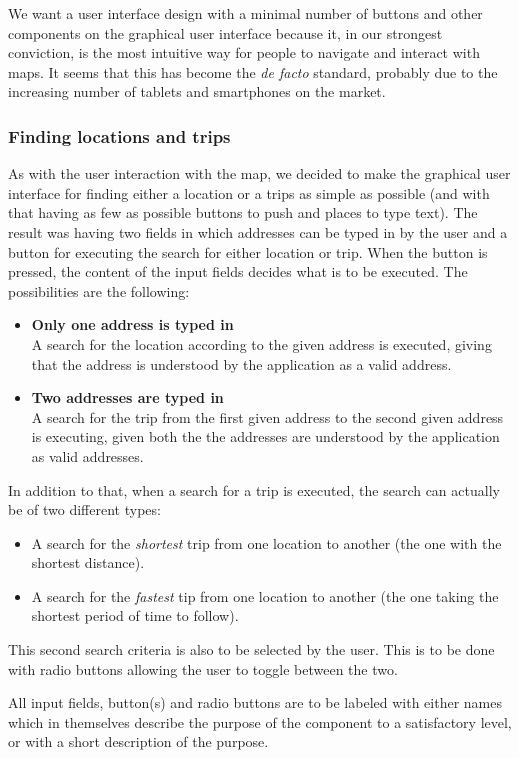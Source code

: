\documentclass[a4paper,11pt]{article}
\begin{document}
We want a user interface design with a minimal number of buttons and other components on the graphical user interface because it, in our strongest conviction, is the most intuitive way for people to navigate and interact with maps. It seems that this has become the \textit{de facto} standard, probably due to the increasing number of tablets and smartphones on the market.

\subsubsection{Finding locations and trips}
As with the user interaction with the map, we decided to make the graphical user interface for finding either a location or a trips as simple as possible (and with that having as few as possible buttons to push and places to type text). The result was having two fields in which addresses can be typed in by the user and a button for executing the search for either location or trip. When the button is pressed, the content of the input fields decides what is to be executed. The possibilities are the following:
\begin{itemize}
	\item \textbf{Only one address is typed in} \\
		A search for the location according to the given address is executed, giving that the address is understood by the application as a valid address.
	\item \textbf{Two addresses are typed in} \\
		A search for the trip from the first given address to the second given address is executing, given both the the addresses are understood by the application as valid addresses.
\end{itemize}
In addition to that, when a search for a trip is executed, the search can actually be of two different types:
\begin{itemize}
	\item A search for the \textit{shortest} trip from one location to another (the one with the shortest distance).
	\item A search for the \textit{fastest} tip from one location to another (the one taking the shortest period of time to follow).
\end{itemize}
This second search criteria is also to be selected by the user. This is to be done with radio buttons allowing the user to toggle between the two.

All input fields, button(s) and radio buttons are to be labeled with either names which in themselves describe the purpose of the component to a satisfactory level, or with a short description of the purpose.
\end{document}
